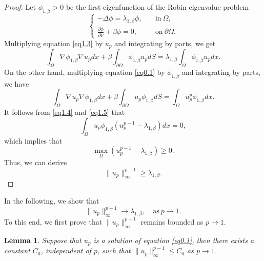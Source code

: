 \documentclass[12pt,reqno]{amsart}
\numberwithin{equation}{section}
\newtheorem{lemma}[theorem]{Lemma}
\theoremstyle{definition}
\begin{document}
\begin{proof}
Let $\phi_{1,\beta}>0$ be the first eigenfunction of the Robin eigenvalue problem 
\begin{equation}\label{eq1.3}
\begin{cases}
-\Delta \phi=\lambda_{1,\beta}\phi,\quad &\text{in}\ \Omega,\\
\frac{\partial \phi}{\partial \nu}+\beta \phi=0, &\text{on}\ \partial\Omega.
\end{cases}
\end{equation}
Multiplying equation \eqref{eq1.3} by $u_p$ and integrating by parts, we get
\begin{equation}\label{eq1.4}
\int_{\Omega}\nabla \phi_{1,\beta}\nabla u_p dx+\beta\int_{\partial\Omega}\phi_{1,\beta}u_p dS=\lambda_{1,\beta}\int_{\Omega}\phi_{1,\beta}u_p dx.
\end{equation}
On the other hand, multiplying equation \eqref{eq0.1} by $\phi_{1,\beta}$ and integrating by parts, we have 
\begin{equation}\label{eq1.5}
\int_{\Omega}\nabla u_p \nabla \phi_{1,\beta} dx+\beta\int_{\partial\Omega}u_p \phi_{1,\beta}dS=\int_{\Omega}u_p^p\phi_{1,\beta} dx.
\end{equation}
It follows from \eqref{eq1.4} and \eqref{eq1.5} that 
\begin{equation*}
\int_{\Omega}u_p\phi_{1,\beta}(u_p^{p-1}-\lambda_{1,\beta})dx=0,
\end{equation*}
which implies that 
$$
\max_{\Omega} (u_p^{p-1}-\lambda_{1,\beta})\ge 0.
$$
Thus, we can derive 
$$
\|u_p\|^{p-1}_\infty\ge \lambda_{1,\beta}.
$$
\end{proof}

In the following, we show that 
$$
\|u_p\|^{p-1}_\infty\to \lambda_{1,\beta},\quad \text{as}\ p\to1.
$$
To this end, we first prove that $\|u_p\|^{p-1}_\infty$ remains bounded as $p\to 1$. 



\begin{lemma}\label{lemma2.4}
Suppose that $u_p$ is a solution of equation \eqref{eq0.1}, then there exists a constant $C_0$, independent of $p$, such that $\|u_p\|^{p-1}_\infty\le C_0$ as $p\to 1$.

\end{lemma}
\end{document}

